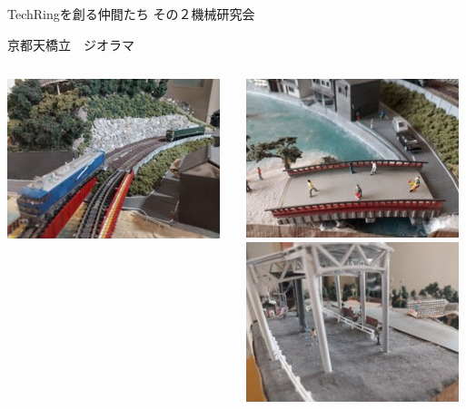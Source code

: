 \documentclass[dvipdfmx]{beamer}
\begin{document}
\begin{frame}{TechRingを創る仲間たち その２}{機械研究会}
\begin{alertblock}{京都天橋立　ジオラマ}
\begin{columns}[totalwidth=\textwidth]
\begin{column}{0.22\textwidth}
        \includegraphics[scale=0.4]{pic/mekaken3.jpg}
      \end{column}
      \begin{column}{0.25\textwidth}
        \includegraphics[scale=0.4]{pic/mekaken4.jpg}\\
        \includegraphics[scale=0.4]{pic/mekaken5.jpg}
      \end{column}
    \end{columns}
  \end{alertblock}


\end{frame}
\end{document}
